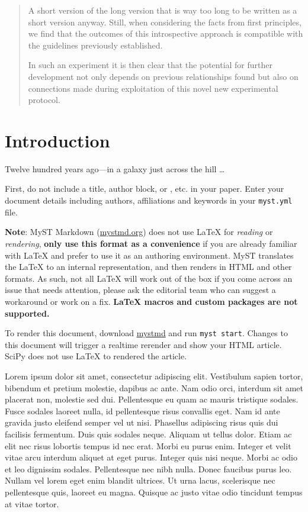 \begin{abstract}
   A short version of the long version that is way too long to be written as a short version anyway. Still, when considering the facts from first principles, we find that the outcomes of this introspective approach is compatible with the guidelines previously established.

   In such an experiment it is then clear that the potential for further development not only depends on previous relationships found but also on connections made during exploitation of this novel new experimental protocol.
\end{abstract}

\section{Introduction}\label{introduction}

Twelve hundred years ago—in a galaxy just across the hill \ldots

First, do not include a title, author block, or \verb||, etc.
in your paper. Enter your document details including authors, affiliations and keywords in your \texttt{myst.yml} file.

\textbf{Note}: MyST Markdown (\href{https://mystmd.org}{mystmd.org}) does not use
LaTeX for \emph{reading} or \emph{rendering}, \textbf{only use this format as a convenience} if you are
already familiar with LaTeX and prefer to use it as an authoring environment.
MyST translates the LaTeX to an internal representation, and then renders in HTML and other formats.
As such, not all LaTeX will work out of the box if you come across an issue that needs attention,
please ask the editorial team who can suggest a workaround or work on a fix.
\textbf{LaTeX macros and custom packages are not supported.}

To render this document, download \href{https://mystmd.org/guide/quickstart}{mystmd} and run \texttt{myst start}.
Changes to this document will trigger a realtime rerender and show your HTML article.
SciPy does not use LaTeX to rendered the article.

Lorem ipsum dolor sit amet, consectetur adipiscing elit. Vestibulum sapien
tortor, bibendum et pretium molestie, dapibus ac ante. Nam odio orci, interdum
sit amet placerat non, molestie sed dui. Pellentesque eu quam ac mauris
tristique sodales. Fusce sodales laoreet nulla, id pellentesque risus convallis
eget. Nam id ante gravida justo eleifend semper vel ut nisi. Phasellus
adipiscing risus quis dui facilisis fermentum. Duis quis sodales neque. Aliquam
ut tellus dolor. Etiam ac elit nec risus lobortis tempus id nec erat. Morbi eu
purus enim. Integer et velit vitae arcu interdum aliquet at eget purus. Integer
quis nisi neque. Morbi ac odio et leo dignissim sodales. Pellentesque nec nibh
nulla. Donec faucibus purus leo. Nullam vel lorem eget enim blandit ultrices.
Ut urna lacus, scelerisque nec pellentesque quis, laoreet eu magna. Quisque ac
justo vitae odio tincidunt tempus at vitae tortor.


